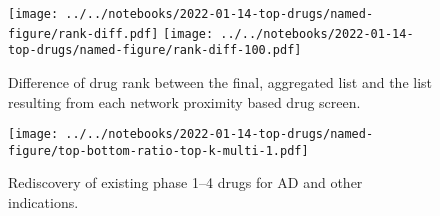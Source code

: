\documentclass[letterpaper]{article}
\begin{document}
\begin{figure}[p]
\texttt{[image: ../../notebooks/2022-01-14-top-drugs/named-figure/rank-diff.pdf]}
\texttt{[image: ../../notebooks/2022-01-14-top-drugs/named-figure/rank-diff-100.pdf]}
\caption{
Difference of drug rank between the final, aggregated list and the list
resulting from each network proximity based drug screen.
}
\label{fig:rank-diff}
\end{figure}

\begin{figure}[p]
\texttt{[image: ../../notebooks/2022-01-14-top-drugs/named-figure/top-bottom-ratio-top-k-multi-1.pdf]}
\caption{
Rediscovery of existing phase 1--4 drugs for AD and other indications.
}
\label{fig:ad-drug-rediscovery-multi}
\end{figure}
\end{document}
